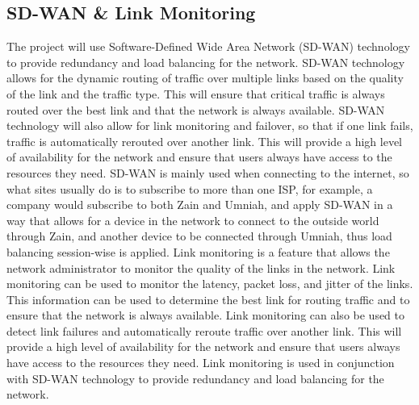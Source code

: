\documentclass[12pt]{report}
\begin{document}
\subsection{SD-WAN \& Link Monitoring}
The project will use Software-Defined Wide Area Network (SD-WAN) technology to provide redundancy and load balancing for the network. SD-WAN technology allows for the dynamic routing of traffic over multiple links based on the quality of the link and the traffic type. This will ensure that critical traffic is always routed over the best link and that the network is always available. SD-WAN technology will also allow for link monitoring and failover, so that if one link fails, traffic is automatically rerouted over another link. This will provide a high level of availability for the network and ensure that users always have access to the resources they need. SD-WAN is mainly used when connecting to the internet, so what sites usually do is to subscribe to more than one ISP, for example, a company would subscribe to both Zain and Umniah, and apply SD-WAN in a way that allows for a device in the network to connect to the outside world through Zain, and another device to be connected through Umniah, thus load balancing session-wise is applied. %
Link monitoring is a feature that allows the network administrator to monitor the quality of the links in the network. Link monitoring can be used to monitor the latency, packet loss, and jitter of the links. This information can be used to determine the best link for routing traffic and to ensure that the network is always available. Link monitoring can also be used to detect link failures and automatically reroute traffic over another link. This will provide a high level of availability for the network and ensure that users always have access to the resources they need. Link monitoring is used in conjunction with SD-WAN technology to provide redundancy and load balancing for the network. %
\end{document}

